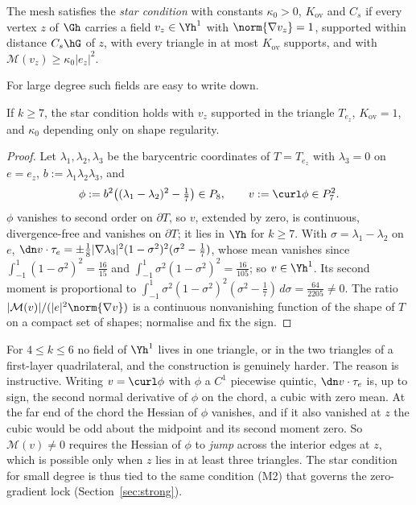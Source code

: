 \begin{definition}\label{def:star}
The mesh satisfies the \emph{star condition} with constants $\kappa_0>0$, $K_{\mathrm{ov}}$ and $C_s$ if every vertex $z$ of $\Gh$ carries a field $v_z\in\Yh^1$ with $\norm{\nabla v_z}=1$, supported within distance $C_s\hG$ of $z$, with every triangle in at most $K_{\mathrm{ov}}$ supports, and with $\mathcal M(v_z)\ge\kappa_0|e_z|^2$.
\end{definition}

For large degree such fields are easy to write down.

\begin{lemma}\label{lem:k7}
If $k\ge7$, the star condition holds with $v_z$ supported in the triangle $T_{e_z}$, $K_{\mathrm{ov}}=1$, and $\kappa_0$ depending only on shape regularity.
\end{lemma}

\begin{proof}
Let $\lambda_1,\lambda_2,\lambda_3$ be the barycentric coordinates of $T=T_{e_z}$ with $\lambda_3=0$ on $e=e_z$, $b:=\lambda_1\lambda_2\lambda_3$, and
\[
\phi:=b^2\bigl((\lambda_1-\lambda_2)^2-\tfrac17\bigr)\in P_8,\qquad v:=\curl\phi\in P_7^2 .
\]
$\phi$ vanishes to second order on $\partial T$, so $v$, extended by zero, is continuous, divergence-free and vanishes on $\partial T$; it lies in $\Yh$ for $k\ge7$. With $\sigma=\lambda_1-\lambda_2$ on $e$, $\dn v\cdot\tau_e=\pm\frac18|\nabla\lambda_3|^2(1-\sigma^2)^2(\sigma^2-\frac17)$, whose mean vanishes since $\int_{-1}^1(1-\sigma^2)^2=\frac{16}{15}$ and $\int_{-1}^1\sigma^2(1-\sigma^2)^2=\frac{16}{105}$; so $v\in\Yh^1$. Its second moment is proportional to $\int_{-1}^1\sigma^2(1-\sigma^2)^2(\sigma^2-\frac17)\,d\sigma=\frac{64}{2205}\ne0$. The ratio $|\mathcal M(v)|/(|e|^2\norm{\nabla v})$ is a continuous nonvanishing function of the shape of $T$ on a compact set of shapes; normalise and fix the sign.
\end{proof}

For $4\le k\le6$ no field of $\Yh^1$ lives in one triangle, or in the two triangles of a first-layer quadrilateral, and the construction is genuinely harder. The reason is instructive. Writing $v=\curl\phi$ with $\phi$ a $C^1$ piecewise quintic, $\dn v\cdot\tau_e$ is, up to sign, the second normal derivative of $\phi$ on the chord, a cubic with zero mean. At the far end of the chord the Hessian of $\phi$ vanishes, and if it also vanished at $z$ the cubic would be odd about the midpoint and its second moment zero. So $\mathcal M(v)\ne0$ requires the Hessian of $\phi$ to \emph{jump} across the interior edges at $z$, which is possible only when $z$ lies in at least three triangles. The star condition for small degree is thus tied to the same condition (M2) that governs the zero-gradient lock (Section~\ref{sec:strong}).

